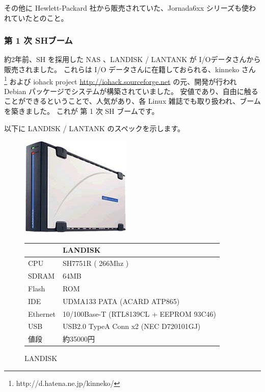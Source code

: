 \documentclass[mingoth,a4paper]{jsarticle}
\begin{document}
その他に Hewlett-Packard 社から販売されていた、Jornada6xx シリーズも使われていたとのこと。


\subsubsection{第 1 次 SHブーム}

約2年前、SH を採用した NAS 、LANDISK / LANTANK  が I/Oデータさんから販売されました。
これらは I/O データさんに在籍しておられる、kinneko さん \footnote{http://d.hatena.ne.jp/kinneko/} および iohack project \url{http://iohack.sourceforge.net}
の元、開発が行われ Debian パッケージでシステムが構築されていました。
安値であり、自由に触ることができるということで、人気があり、各 Linux 雑誌でも取り扱われ、ブームを築きました。
これが 第 1 次 SH ブームです。

以下に LANDISK / LANTANK のスペックを示します。
\begin{figure}[htbp]
 \begin{minipage}{0.5\hsize}
  \includegraphics[width=0.6\hsize]{image200705/landisk00.jpg}
  \caption{LANDISK}
 \end{minipage}
 \begin{minipage}{0.5\hsize}
  \begin{tabular}{|l|l|} \hline
   & LANDISK \\ \hline
   CPU & SH7751R ( 266Mhz ) \\ \hline
   SDRAM & 64MB\\ \hline
   Flash & ROM \\ \hline
   IDE & UDMA133 PATA (ACARD ATP865)\\ \hline
   Ethernet & 10/100Base-T (RTL8139CL + EEPROM 93C46) \\ \hline
   USB & USB2.0 TypeA Conn x2 (NEC D720101GJ) \\ \hline
   値段 & 約35000円 \\ \hline 
 \end{tabular}
 \end{minipage}
\end{figure}
\end{document}
